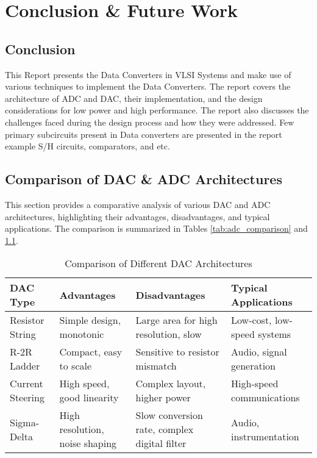 \chapter{Conclusion \& Future Work}
\section{Conclusion}
This Report presents the Data Converters in VLSI Systems and make use of various techniques to implement the Data Converters. The report covers the architecture of ADC and DAC, their implementation, and the design considerations for low power and high performance. The report also discusses the challenges faced during the design process and how they were addressed.
Few primary subcircuits present in Data converters are presented in the report example S/H circuits, comparators, and etc. 
\section{Comparison of DAC \& ADC Architectures}
This section provides a comparative analysis of various DAC and ADC architectures, highlighting their advantages, disadvantages, and typical applications. The comparison is summarized in Tables \ref{tab:adc_comparison} and \ref{tab:dac_comparison}.
\begin{table}[h!]
\centering
\begin{tabular}{|p{2.8cm}|p{4cm}|p{4cm}|p{4cm}|}
\hline
\textbf{DAC Type} & \textbf{Advantages} & \textbf{Disadvantages} & \textbf{Typical Applications} \\
\hline
Resistor String & Simple design, monotonic & Large area for high resolution, slow & Low-cost, low-speed systems \\
\hline
R-2R Ladder & Compact, easy to scale & Sensitive to resistor mismatch & Audio, signal generation \\
\hline
Current Steering & High speed, good linearity & Complex layout, higher power & High-speed communications \\
\hline
Sigma-Delta & High resolution, noise shaping & Slow conversion rate, complex digital filter & Audio, instrumentation \\
\hline
\end{tabular}
\caption{Comparison of Different DAC Architectures}
\label{tab:dac_comparison}
\end{table}


